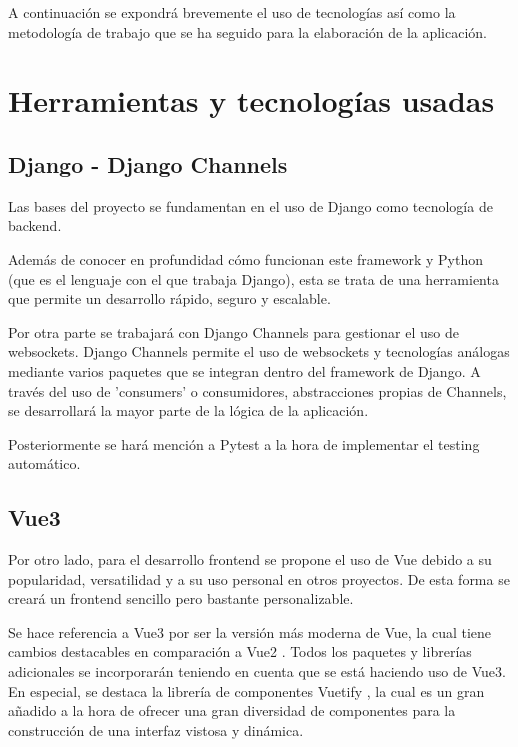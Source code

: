 A continuación se expondrá brevemente el uso de tecnologías así como la metodología
de trabajo que se ha seguido para la elaboración de la aplicación.

\section{Herramientas y tecnologías usadas}

\subsection{Django - Django Channels}

Las bases del proyecto se fundamentan en el uso de Django \cite{django} como tecnología de backend.

Además de conocer en profundidad cómo funcionan este framework y Python (que es el lenguaje con el que trabaja Django),
esta se trata de una herramienta que permite un desarrollo rápido, seguro y escalable.

Por otra parte se trabajará con Django Channels \cite{djangoChannels} para gestionar el uso de websockets. Django Channels
permite el uso de websockets y tecnologías análogas mediante varios paquetes  que se integran dentro del framework de Django.
A través del uso de 'consumers' o consumidores, abstracciones propias de Channels, 
se desarrollará la mayor parte de la lógica de la aplicación. 

Posteriormente se hará mención a Pytest \cite{pytest} a la hora de implementar el testing automático.

\subsection{Vue3}

Por otro lado, para el desarrollo frontend se propone el uso de Vue \cite{vue3} debido a su popularidad, versatilidad
y a su uso personal en otros proyectos. De esta forma se creará un frontend sencillo pero bastante personalizable.

Se hace referencia a Vue3 por ser la versión más moderna de Vue, la cual tiene cambios destacables en comparación
a Vue2 \cite{vue3vue2}. Todos los paquetes y librerías adicionales se incorporarán teniendo en cuenta que se está haciendo uso de
Vue3. En especial, se destaca la librería de componentes Vuetify \cite{vuetify}, la cual es un gran añadido a la hora de
ofrecer una gran diversidad de componentes para la construcción de una interfaz vistosa y dinámica.

